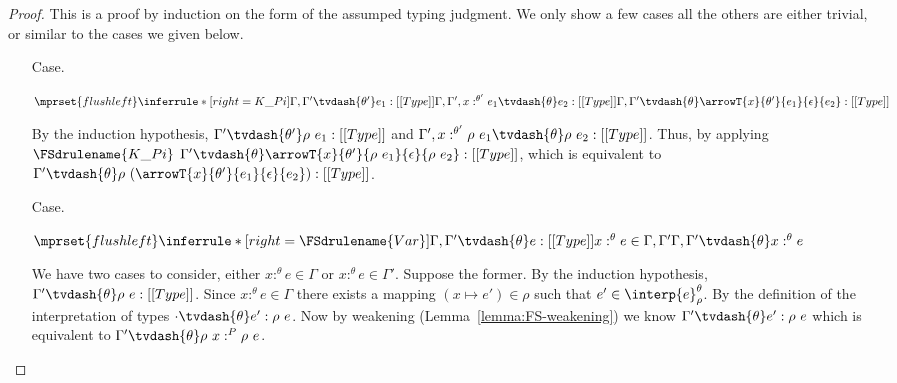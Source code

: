 \begin{proof}
  This is a proof by induction on the form of the assumped typing
  judgment. We only show a few cases all the others are either
  trivial, or similar to the cases we given below.
  \begin{itemize}      
    \item[Case.]\ \\
      \begin{center}
        \begin{math}
          $$\mprset{flushleft}
          \inferrule* [right=K\_Pi] {
            \Gamma,\Gamma' \tvdash{\theta'} e_1:[[Type]]
            \\\\
            \Gamma,\Gamma',x:^{\theta'} e_1 \tvdash{\theta} e_2:[[Type]]
          }{\Gamma,\Gamma' \tvdash{\theta} \arrowT{x}{\theta'}{e_1}{\epsilon}{e_2}:[[Type]]}
        \end{math}
      \end{center}
      By the induction hypothesis, $\Gamma' \tvdash{\theta'} \rho\ e_1:[[Type]]$ and
      $\Gamma',x:^{\theta'} \rho\ e_1 \tvdash{\theta} \rho\ e_2:[[Type]]$.  Thus, by applying 
      $\FSdrulename{K\_Pi}$ 
      $\Gamma' \tvdash{\theta} \arrowT{x}{\theta'}{\rho\ e_1}{\epsilon}{\rho\ e_2}:[[Type]]$, which
      is equivalent to 
      $\Gamma' \tvdash{\theta} \rho\ (\arrowT{x}{\theta'}{e_1}{\epsilon}{e_2}):[[Type]]$.      
  \end{itemize}
  
  \begin{itemize}
  \item[Case.] \ \\
    \begin{center}
      \begin{math}
        $$\mprset{flushleft}
        \inferrule* [right=\FSdrulename{Var}]{
          \Gamma,\Gamma' \tvdash{\theta} e:[[Type]]
          \\\\
          x:^{\theta} e \in \Gamma,\Gamma'
        }{\Gamma,\Gamma' \tvdash{\theta} x:^{\theta} e}
      \end{math}
    \end{center}
    We have two cases to consider, either $x:^{\theta} e \in \Gamma$ or $x:^{\theta} e \in \Gamma'$.
    Suppose the former.
    By the induction hypothesis, $\Gamma' \tvdash{\theta} \rho\ e:[[Type]]$.  Since
    $x:^{\theta} e \in \Gamma$ there exists a mapping $(x \mapsto e') \in \rho$ such that 
    $e' \in \interp{e}^\theta_\rho$.  By the definition of the interpretation of types
    $\cdot \tvdash{\theta} e':\rho\ e$.  Now by weakening (Lemma~\ref{lemma:FS-weakening}) we know
    $\Gamma' \tvdash{\theta} e':\rho\ e$ which is equivalent to $\Gamma' \tvdash{\theta} \rho\ x:^{P} \rho\ e$.
    

\end{itemize}
\end{proof}
